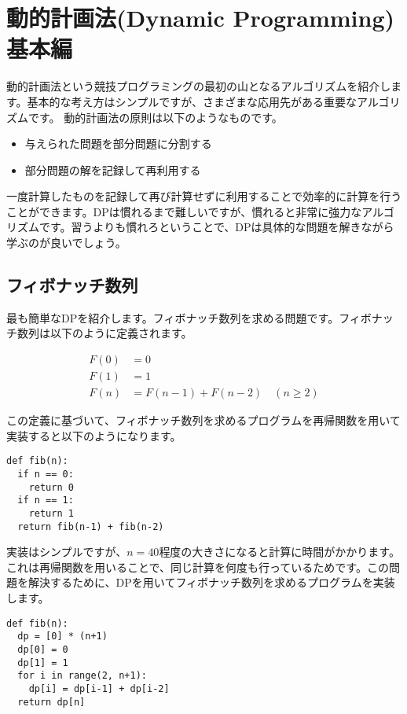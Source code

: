 \documentclass{jlreq}
\begin{document}
\section{動的計画法(Dynamic Programming) 基本編}
動的計画法という競技プログラミングの最初の山となるアルゴリズムを紹介します。基本的な考え方はシンプルですが、さまざまな応用先がある重要なアルゴリズムです。
動的計画法の原則は以下のようなものです。

\begin{itemize}
  \item 与えられた問題を部分問題に分割する
  \item 部分問題の解を記録して再利用する
\end{itemize}

一度計算したものを記録して再び計算せずに利用することで効率的に計算を行うことができます。DPは慣れるまで難しいですが、慣れると非常に強力なアルゴリズムです。習うよりも慣れろということで、DPは具体的な問題を解きながら学ぶのが良いでしょう。

\subsection{フィボナッチ数列}
最も簡単なDPを紹介します。フィボナッチ数列を求める問題です。フィボナッチ数列は以下のように定義されます。

\begin{align*}
  F(0) &= 0 \\
  F(1) &= 1 \\
  F(n) &= F(n-1) + F(n-2) \quad (n \geq 2)
\end{align*}

この定義に基づいて、フィボナッチ数列を求めるプログラムを再帰関数を用いて実装すると以下のようになります。
\begin{lstlisting}[caption=再帰関数を用いたフィボナッチ数列の実装, frame=TRBL, label={rec_fib}]
def fib(n):
  if n == 0:
    return 0
  if n == 1:
    return 1
  return fib(n-1) + fib(n-2)
\end{lstlisting}

実装はシンプルですが、$n = 40$程度の大きさになると計算に時間がかかります。これは再帰関数を用いることで、同じ計算を何度も行っているためです。この問題を解決するために、DPを用いてフィボナッチ数列を求めるプログラムを実装します。

\begin{lstlisting}[caption=DPを用いたフィボナッチ数列の実装, frame=TRBL, label={dp_fib}]
def fib(n):
  dp = [0] * (n+1)
  dp[0] = 0
  dp[1] = 1
  for i in range(2, n+1):
    dp[i] = dp[i-1] + dp[i-2]
  return dp[n]
\end{lstlisting}
\end{document}

